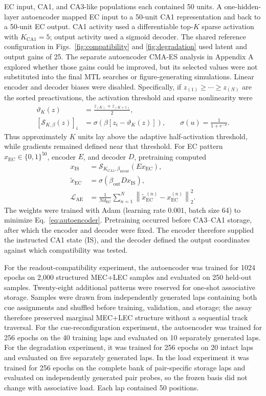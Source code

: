 EC input, CA1, and CA3-like populations each contained 50 units. A one-hidden-
layer autoencoder mapped EC input to a 50-unit CA1 representation and back to a
50-unit EC output. CA1 activity used a differentiable top-$K$ sparse activation
with $K_{\mathrm{CA1}}=5$; output activity used a sigmoid decoder. The shared
reference configuration in Figs.~\ref{fig:compatibility} and
\ref{fig:degradation} used latent and output gains of 25. The separate
autoencoder CMA-ES analysis in Appendix A explored whether those gains could
be improved, but its selected values were not substituted into the final MTL
searches or figure-generating simulations. Linear encoder and decoder biases
were disabled.
Specifically, if $z_{(1)}\geq\cdots\geq z_{(N)}$ are the sorted
preactivations, the activation threshold and sparse nonlinearity were
\begin{align}
\vartheta_K(z) &= \frac{z_{(K)}+z_{(K+1)}}{2},\\
[\mathcal{S}_{K,\beta}(z)]_i
 &= \sigma\!\left(\beta[z_i-\vartheta_K(z)]\right),
\qquad \sigma(u)=\frac{1}{1+e^{-u}}.
\label{eq:sparse-activation}
\end{align}
Thus approximately $K$ units lay above the adaptive half-activation threshold,
while gradients remained defined near that threshold. For EC pattern
$x_{\mathrm{EC}}\in\{0,1\}^{50}$, encoder $E$, and decoder $D$, pretraining
computed
\begin{align}
x_{\mathrm{IS}} &= \mathcal{S}_{K_{\mathrm{CA1}},
 \beta_{\mathrm{latent}}}(E x_{\mathrm{EC}}),\\
\widetilde{x}_{\mathrm{EC}} &=
 \sigma(\beta_{\mathrm{out}}D x_{\mathrm{IS}}),\\
\mathcal{L}_{\mathrm{AE}} &=
 \frac{1}{N d_{\mathrm{EC}}}\sum_{n=1}^{N}
 \left\|\widetilde{x}_{\mathrm{EC}}^{(n)}
             -x_{\mathrm{EC}}^{(n)}\right\|_2^2.
\label{eq:autoencoder}
\end{align}
The weights were trained with Adam (learning rate 0.001, batch size 64) to
minimize Eq.~\ref{eq:autoencoder}. Pretraining occurred before
CA3--CA1 storage, after which the encoder and decoder were fixed. The encoder
therefore supplied the instructed CA1 state (IS), and the decoder defined the
output coordinates against which compatibility was tested.

For the readout-compatibility experiment, the autoencoder was trained for 1024
epochs on 2,000 structured MEC+LEC samples and evaluated on 250 held-out
samples. Twenty-eight additional patterns were reserved for one-shot
associative storage. Samples were drawn from independently generated laps
containing both cue assignments and shuffled before training, validation, and
storage; the assay therefore preserved marginal MEC+LEC structure without a
sequential track traversal. For the cue-reconfiguration experiment, the
autoencoder was trained for 256 epochs on the 40 training laps and evaluated on
10 separately generated laps. For the degradation experiment, it was trained
for 256 epochs on 20 intact laps and evaluated on five separately generated
laps. In the load experiment it was trained for 256 epochs on the complete bank
of pair-specific storage laps and evaluated on independently generated pair
probes, so the frozen basis did not change with associative load. Each lap
contained 50 positions.

